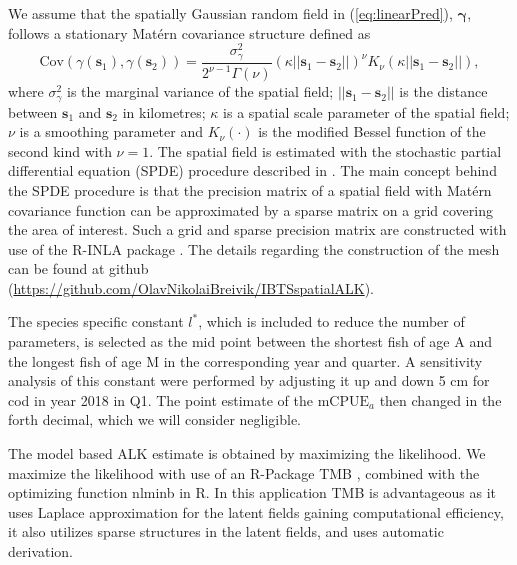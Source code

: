 \documentclass[a4paper 12pt]{article}
\numberwithin{equation}{section}
\newcommand{\nat}[1]{\textcolor{blue}{#1}}
\begin{document}
We assume that the spatially Gaussian random field in (\ref{eq:linearPred}), $\pmb{\gamma}$, follows a stationary Mat\'{e}rn covariance structure defined as
\begin{equation}\label{eq:matern}
 \text{Cov}(\gamma(\mathbf{s}_1),\gamma(\mathbf{s}_2)) = \frac{\sigma^2_{\gamma}}{2^{\nu-1}\Gamma(\nu)}(\kappa||\mathbf{s}_1 -\mathbf{s}_2||)^{\nu}K_{\nu}(\kappa||\mathbf{s}_1-\mathbf{s}_2||),
\end{equation}
where $\sigma^2_{\gamma}$ is the marginal variance of the spatial field; $||\mathbf{s}_1-\mathbf{s}_2||$ is the distance between $\mathbf{s}_1$ and $\mathbf{s}_2$ in kilometres; $\kappa$ is a spatial scale parameter of the spatial field; $\nu$ is a smoothing parameter and $K_{\nu}(\cdot)$ is the modified Bessel function of the second kind with $\nu = 1$.  The spatial field is estimated with the stochastic partial differential equation (SPDE) procedure described in \citet{lindgren2011explicit}. The main concept behind the SPDE procedure is that the precision matrix of a spatial field with Mat\'{e}rn  covariance function can be approximated by a sparse matrix on a grid covering the area of interest. Such a grid and sparse precision matrix are constructed with use of the R-INLA package \citep{rue2009approximate}. The details regarding the construction of the mesh can be found at github (\href{https://github.com/OlavNikolaiBreivik/IBTSspatialALK}{https://github.com/OlavNikolaiBreivik/IBTSspatialALK}).

The species specific constant $l^*$, which is included to reduce the number of parameters, is selected as the mid point between the shortest fish of age A and the longest fish of age M in the corresponding year and quarter. A sensitivity analysis of this constant were performed by adjusting it up and down 5 cm for cod in year 2018 in Q1. The point estimate of the $\text{mCPUE}_a$ then changed in the forth decimal, which we will consider negligible. 



The model based ALK estimate is obtained by maximizing the likelihood. We maximize the likelihood with use of an R-Package {\sffamily TMB} \citep{kristensen2015tmb}, combined with the optimizing function {\sffamily nlminb} in R. In this application {\sffamily TMB} is advantageous as it uses Laplace approximation for the latent fields gaining computational efficiency, it also utilizes sparse structures in the latent fields, and uses automatic derivation. 
\end{document}
